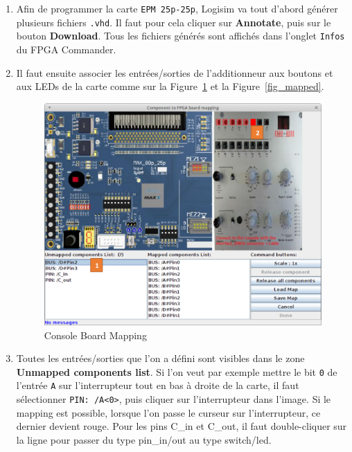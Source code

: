 \documentclass[nosolution]{exercice}
\begin{document}
\begin{enumerate}
\item Afin de programmer la carte \texttt{EPM 25p-25p}, Logisim va tout d'abord générer plusieurs fichiers
\texttt{.vhd}. Il faut pour cela cliquer sur \textbf{Annotate}, puis sur le bouton \textbf{Download}.
Tous les fichiers générés sont affichés dans l'onglet \texttt{Infos} du FPGA Commander.

\item Il faut ensuite associer les entrées/sorties de l'additionneur aux boutons et aux LEDs de la carte comme sur la
Figure~\ref{fig_mapping} et la Figure~\ref{fig_mapped}.

\begin{figure}[H]
\begin{center}
\includegraphics[scale=0.42]{images/logisim_mapping.png}
\caption{\label{fig_mapping}Console Board Mapping}
\end{center}
\end{figure}

\item Toutes les entrées/sorties que l'on a défini sont visibles dans le zone \textbf{Unmapped components list}. Si l'on veut
par exemple mettre le bit \texttt{0} de l'entrée \texttt{A} sur l'interrupteur tout en bas à droite de la carte, il faut
sélectionner \texttt{PIN: /A<0>}, puis cliquer sur l'interrupteur dans l'image. Si le mapping est possible, lorsque l'on
passe le curseur sur l'interrupteur, ce dernier devient rouge. Pour les pins C\_in et C\_out, il faut double-cliquer sur la ligne pour passer du type pin\_in/out au type switch/led.



\end{enumerate}
\end{document}
